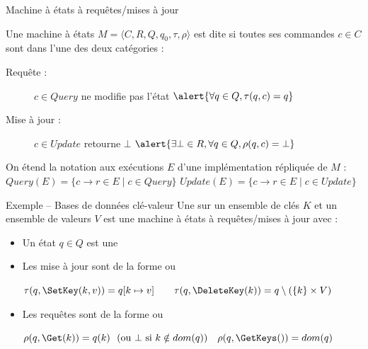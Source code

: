 
\begingroup


\begin{frame}{Machine à états à requêtes/mises à jour}

  Une machine à états $M=\langle C, R, Q, q_0, \tau, \rho \rangle$ est dite  si
  toutes ses commandes $c\in C$ sont dans l'une des deux catégories : 
  \begin{description}
  \item[Requête :] \alert{$c \in \mathit{Query}$} ne modifie pas l'état
    \hspace{\fill} $\alert{\forall q\in Q, \tau(q, c) = q}$\\
  \item[Mise à jour :] \alert{$c \in \mathit{Update}$} retourne $\bot$
    \hspace{\fill} $\alert{\exists \bot\in R, \forall q\in Q, \rho(q, c) = \bot}$\\
  \end{description}

  \vspace{2mm}
  On étend la notation aux exécutions $E$ d'une implémentation répliquée de $M$ :
  \alert{$\mathit{Query}(E) = \{ c\rightarrow r \in E \mid c \in \mathit{Query} \}$ \hspace{\fill} $\mathit{Update}(E) = \{ c\rightarrow r \in E \mid c \in \mathit{Update} \}$}

  \pause
  \vspace{2mm}

  \begin{exampleblock}{Exemple -- Bases de données clé-valeur}
    Une  sur un ensemble de clés $K$ et un ensemble de valeurs $V$
    est une machine à états à requêtes/mises à jour avec : 
    \begin{itemize}
    \item Un état $q\in Q$ est une 
    \item Les mise à jour sont de la forme  ou 
      \begin{center}
        $\tau(q, \SetKey(k,v)) = q[k \mapsto v]  \quad\quad \tau(q, \DeleteKey(k)) = q \setminus (\{k\}\times V)$
      \end{center}
    \item Les requêtes sont de la forme  ou \example{$\GetKeys()$}
      \begin{center}
        $\rho(q, \Get(k)) = q(k) ~~ (\text{ou } \bot \text{ si } k \notin dom(q))  \quad \rho(q, \GetKeys()) = dom(q)$
      \end{center}
    \end{itemize}
  \end{exampleblock}

\end{frame}

\endgroup
\endinput
